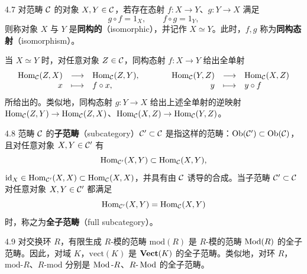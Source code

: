 \begin{definition}{4.7}
对范畴 $\mathcal{C}$ 的对象 $X,Y\in\mathcal{C}$，若存在态射 $f\colon X\to Y$、$g\colon Y\to X$ 满足
\[ g\circ f=1_X,\qquad f\circ g=1_Y, \]
则称对象 $X$ 与 $Y$ 是\textbf{同构的}（isomorphic），并记作 $X\simeq Y$。此时，$f,g$ 称为\textbf{同构态射}（isomorphism）。
\end{definition}

当 $X\simeq Y$ 时，对任意对象 $Z\in\mathcal{C}$，同构态射 $f\colon X\to Y$ 给出全单射
\[
\begin{array}{rclcrcl}
  \operatorname{Hom}_{\mathcal{C}}(Z,X) & \longrightarrow & \operatorname{Hom}_{\mathcal{C}}(Z,Y), & \qquad & \operatorname{Hom}_{\mathcal{C}}(Y,Z) & \longrightarrow & \operatorname{Hom}_{\mathcal{C}}(X,Z)\\
  x & \longmapsto & f\circ x, & & y & \longmapsto & y\circ f
\end{array}
\]
所给出的。类似地，同构态射 $g\colon Y\to X$ 给出上述全单射的逆映射 $\operatorname{Hom}_{\mathcal{C}}(Z,Y)\to\operatorname{Hom}_{\mathcal{C}}(Z,X)$、$\operatorname{Hom}_{\mathcal{C}}(X,Z)\to\operatorname{Hom}_{\mathcal{C}}(Y,Z)$。

\begin{definition}{4.8}
范畴 $\mathcal{C}$ 的\textbf{子范畴}（subcategory）$\mathcal{C}'\subset\mathcal{C}$ 是指这样的范畴：$\operatorname{Ob}(\mathcal{C}')\subset\operatorname{Ob}(\mathcal{C})$，且对任意对象 $X,Y\in\mathcal{C}'$ 有
\[ \operatorname{Hom}_{\mathcal{C}'}(X,Y)\subset\operatorname{Hom}_{\mathcal{C}}(X,Y), \]
$\mathrm{id}_X\in\operatorname{Hom}_{\mathcal{C}'}(X,X)\subset\operatorname{Hom}_{\mathcal{C}}(X,X)$，并具有由 $\mathcal{C}$ 诱导的合成。当子范畴 $\mathcal{C}'\subset\mathcal{C}$ 对任意对象 $X,Y\in\mathcal{C}'$ 都满足
\[ \operatorname{Hom}_{\mathcal{C}'}(X,Y)=\operatorname{Hom}_{\mathcal{C}}(X,Y) \]
时，称之为\textbf{全子范畴}（full subcategory）。
\end{definition}

\begin{example}{4.9}
对交换环 $R$，有限生成 $R$-模的范畴 $\mathrm{mod}(R)$ 是 $R$-模的范畴 $\operatorname{Mod}(R)$ 的全子范畴。因此，对域 $K$，$\mathrm{vect}(K)$ 是 $\mathbf{Vect}(K)$ 的全子范畴。类似地，对环 $R$，$\mathrm{mod}\text{-}R$、$R\text{-}\mathrm{mod}$ 分别是 $\operatorname{Mod}\text{-}R$、$R\text{-}\operatorname{Mod}$ 的全子范畴。
\end{example}

